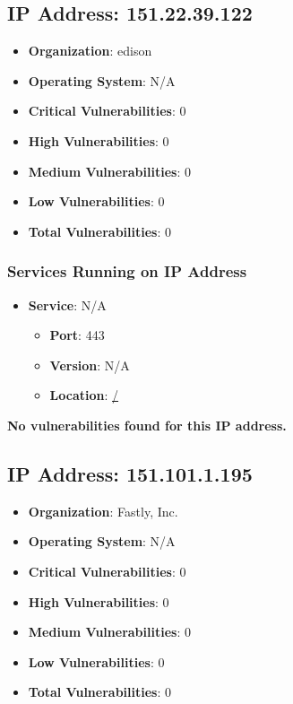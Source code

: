 \documentclass{article}
\begin{document}
\clearpage



\subsection*{IP Address: 151.22.39.122}

\begin{itemize}
    \item \textbf{Organization}: edison
    \item \textbf{Operating System}:  N/A 
    \item \textbf{Critical Vulnerabilities}: 0
    \item \textbf{High Vulnerabilities}: 0
    \item \textbf{Medium Vulnerabilities}: 0
    \item \textbf{Low Vulnerabilities}: 0
    \item \textbf{Total Vulnerabilities}: 0
\end{itemize}

\subsubsection*{Services Running on IP Address}

\begin{itemize}
    
        \item \textbf{Service}: N/A
        \begin{itemize}
            \item \textbf{Port}: 443
            \item \textbf{Version}:  N/A 
            \item \textbf{Location}: \href{ / }{ / }
        \end{itemize}
    
\end{itemize}


\textbf{No vulnerabilities found for this IP address.}




\clearpage



\subsection*{IP Address: 151.101.1.195}

\begin{itemize}
    \item \textbf{Organization}: Fastly, Inc.
    \item \textbf{Operating System}:  N/A 
    \item \textbf{Critical Vulnerabilities}: 0
    \item \textbf{High Vulnerabilities}: 0
    \item \textbf{Medium Vulnerabilities}: 0
    \item \textbf{Low Vulnerabilities}: 0
    \item \textbf{Total Vulnerabilities}: 0
\end{itemize}
\end{document}
